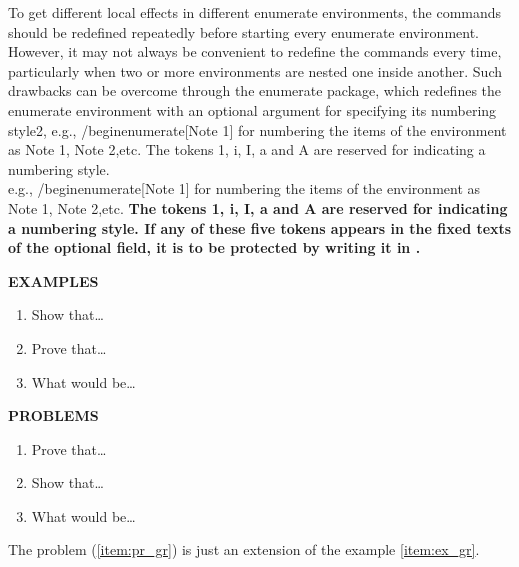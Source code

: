\documentclass[11pt,a4paper]{article}
\begin{document}
To get different local effects in different enumerate environments, the commands should be redefined repeatedly before starting every enumerate environment. However, it may not always be convenient to redefine the commands every time, particularly when two or more environments are nested one inside another. Such drawbacks can be overcome through the enumerate package, which redefines the enumerate environment with an optional argument for specifying its numbering style2, e.g., /begin{enumerate}[Note 1] for numbering the items of the environment as Note 1, Note 2,etc. The tokens 1, i, I, a and A are reserved for indicating a numbering style.\\[10mm]
e.g., /begin{enumerate}[Note 1] for numbering the items of the environment as Note 1, Note 2,etc. \bfseries The tokens 1, i, I, a and A \normalfont are reserved for indicating a numbering style. If any of these five tokens appears in the fixed texts of the optional field, it is to be protected by writing it in { }.
\vspace{20mm}

    \begin{center}{\bf EXAMPLES}\end{center}
    \begin{enumerate}[{\bf Ex{a}mple 1:}] 
        \item Show that…
        \item Prove that…\label{item:ex_gr}
        \item What would be…
    \end{enumerate}
    \begin{center}{\bf PROBLEMS}\end{center}
    \begin{enumerate}
        \item Prove that…\label{item:pr_gr}
        \item Show that…
        \item What would be…
    \end{enumerate}
    The problem (\ref{item:pr_gr}) is just an
    extension of the example \ref{item:ex_gr}.
\end{document}
